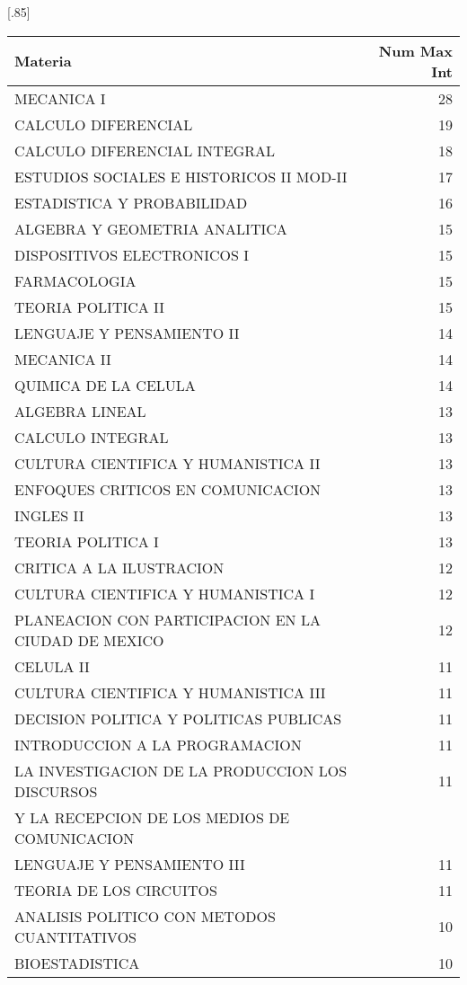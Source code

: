 \documentclass[12pt]{article}
\begin{document}
\begin{table}[ht]
\centering
\scalebox{0.75}[.85]{
\begin{tabular}{lr}
  \hline
 Materia & Num Max Int\\ 
  \hline
 MECANICA I & 28 \\ 
 CALCULO DIFERENCIAL & 19 \\ 
 CALCULO DIFERENCIAL INTEGRAL & 18 \\ 
 ESTUDIOS SOCIALES E HISTORICOS II MOD-II & 17 \\ 
 ESTADISTICA Y PROBABILIDAD & 16 \\ 
 ALGEBRA Y GEOMETRIA ANALITICA & 15 \\ 
 DISPOSITIVOS ELECTRONICOS I & 15 \\ 
 FARMACOLOGIA & 15 \\ 
 TEORIA POLITICA II & 15 \\ 
 LENGUAJE Y PENSAMIENTO II & 14 \\ 
 MECANICA II & 14 \\ 
 QUIMICA DE LA CELULA & 14 \\ 
 ALGEBRA LINEAL & 13 \\ 
 CALCULO INTEGRAL & 13 \\ 
 CULTURA CIENTIFICA Y HUMANISTICA II & 13 \\ 
 ENFOQUES CRITICOS EN COMUNICACION & 13 \\ 
 INGLES II & 13 \\ 
 TEORIA POLITICA I & 13 \\ 
 CRITICA A LA ILUSTRACION & 12 \\ 
 CULTURA CIENTIFICA Y HUMANISTICA I & 12 \\ 
 PLANEACION CON PARTICIPACION EN LA CIUDAD DE MEXICO & 12 \\ 
 CELULA II & 11 \\ 
 CULTURA CIENTIFICA Y HUMANISTICA III & 11 \\ 
 DECISION POLITICA Y POLITICAS PUBLICAS & 11 \\ 
 INTRODUCCION A LA PROGRAMACION & 11 \\ 
 LA INVESTIGACION DE LA PRODUCCION LOS DISCURSOS  & 11 \\ 
 Y LA RECEPCION DE LOS MEDIOS DE COMUNICACION &  \\ 
 LENGUAJE Y PENSAMIENTO III & 11 \\ 
 TEORIA DE LOS CIRCUITOS & 11 \\ 
 ANALISIS POLITICO CON METODOS CUANTITATIVOS & 10 \\ 
 BIOESTADISTICA & 10 \\ 

\end{tabular}}
\end{table}
\end{document}
